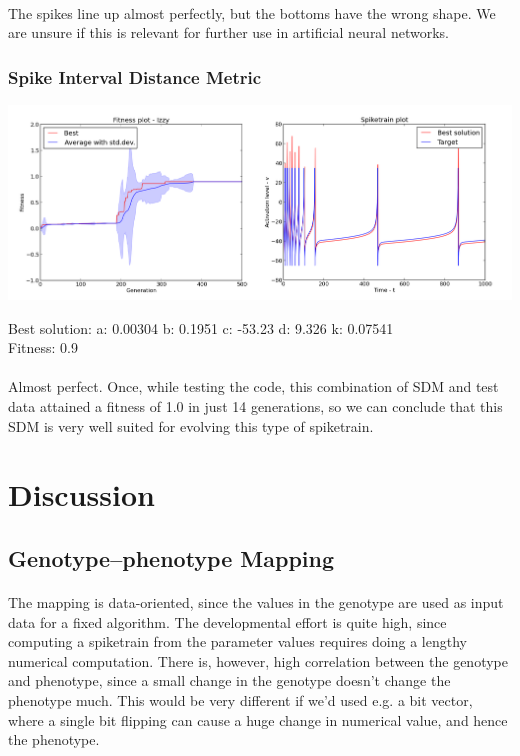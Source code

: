 \documentclass[a4paper,12pt]{article}
\begin{document}
\paragraph{}The spikes line up almost perfectly, but the bottoms have the wrong shape. We are unsure if this is relevant for further use in artificial neural networks.

\subsubsection{Spike Interval Distance Metric}
\centerline{\includegraphics[width=1.2\textwidth]{img/case4_int}}
Best solution: 
a: 0.00304 
b: 0.1951 
c: -53.23 
d: 9.326 
k: 0.07541 \\
Fitness: 0.9
\paragraph{}Almost perfect. Once, while testing the code, this combination of SDM and test data attained a fitness of 1.0 in just 14 generations, so we can conclude that this SDM is very well suited for evolving this type of spiketrain.

\section{Discussion}
\subsection{Genotype--phenotype Mapping}
\paragraph{}The mapping is data-oriented, since the values in the genotype are used as input data for a fixed algorithm. The developmental effort is quite high, since computing a spiketrain from the parameter values requires doing a lengthy numerical computation. There is, however, high correlation between the genotype and phenotype, since a small change in the genotype doesn't change the phenotype much. This would be very different if we'd used e.g. a bit vector, where a single bit flipping can cause a huge change in numerical value, and hence the phenotype.
\end{document}

